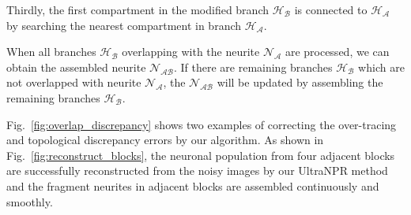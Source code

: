  
Thirdly, the first compartment  in the modified branch $\mathcal{H_B}$ is connected to $\mathcal{H_A}$ by searching the nearest compartment in branch $\mathcal{H_A}$. 
 
When all branches $\mathcal{H_B}$ overlapping with the neurite $\mathcal{N_A}$ are processed, we can obtain the assembled neurite $\mathcal{N_{AB}}$.
If there are remaining branches $\mathcal{H_B}$ which are not overlapped with neurite $\mathcal{N_A}$, the $\mathcal{N_{AB}}$ will be updated by assembling the remaining branches $\mathcal{H_B}$.



Fig.~\ref{fig:overlap_discrepancy} shows two examples of correcting the over-tracing and topological discrepancy errors by our algorithm.
As shown in Fig.~\ref{fig:reconstruct_blocks}, the neuronal population from four adjacent blocks are successfully reconstructed from the noisy images by our UltraNPR method and the fragment neurites in adjacent blocks are assembled continuously and smoothly.


